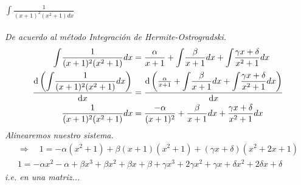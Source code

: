 \documentclass{article}
\newcommand{\ints}{\displaystyle \int \!}
\begin{document}
$\ints \frac{1}{(x+1)^2(x^2+1)dx}$ \\\\
\textit{De acuerdo al método Integración de Hermite-Ostrogradski.}
\begin{align*}
    \ints \frac{1}{(x+1)^2(x^2+1)}dx &= \frac{\alpha}{x+1} + \ints \frac{\beta}{x+1}dx + \ints \frac{\gamma x + \delta}{x^2+1}dx \\
    \dv{\left(\ints \frac{1}{(x+1)^2(x^2+1)}dx\right)}{x} &= \dv{\left(\frac{\alpha}{x+1} + \ints \frac{\beta}{x+1}dx + \ints \frac{\gamma x + \delta}{x^2+1}dx\right)}{x} \\
    \frac{1}{(x+1)^2(x^2+1)}dx &= \frac{-\alpha}{(x+1)^2} + \frac{\beta}{x+1}dx + \frac{\gamma x + \delta}{x^2+1}dx \\
\end{align*}
\textit{Alinearemos nuestro sistema.}
\begin{align*}
    \Rightarrow
    \quad 1 = -\alpha (x^2+1) + \beta(x+1)(x^2+1) + (\gamma x + \delta)(x^2+2x+1) \\
    1 = -\alpha x^2 - \alpha + \beta x^3 + \beta x^2 + \beta x + \beta + \gamma x^3 + 2\gamma x^2 + \gamma x + \delta x^2 + 2\delta x + \delta
\end{align*}
\textit{i.e. en una matriz...} \\
\end{document}
